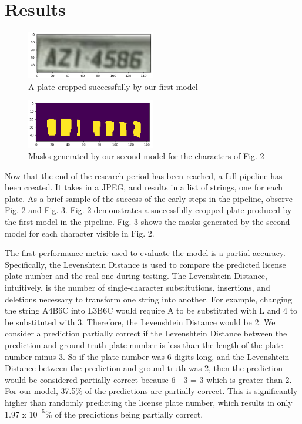 \documentclass[conference]{IEEEtran}
\begin{document}
\section{Results}
\begin{figure}[h]
   \centering
   \includegraphics[width=0.5\textwidth]{plate.png}
   \caption{A plate cropped successfully by our first model}
   \label{fig:image_label}
\end{figure}
\begin{figure}[h]
   \centering
   \includegraphics[width=0.5\textwidth]{charMask.png}
   \caption{Masks generated by our second model for the characters of Fig. 2}
   \label{fig:image_label}
\end{figure}
Now that the end of the research period has been reached, a full pipeline has been created. It takes in a JPEG, and results in a list of strings, one for each plate. As a brief sample of the success of the early steps in the pipeline, observe Fig. 2 and Fig. 3. Fig. 2 demonstrates a successfully cropped plate produced by the first model in the pipeline. Fig. 3 shows the masks generated by the second model for each character visible in Fig. 2. 
\par
The first performance metric used to evaluate the model is a partial accuracy. Specifically, the Levenshtein Distance is used to compare the predicted license plate number and the real one during testing. The Levenshtein Distance, intuitively, is the number of single-character substitutions, insertions, and deletions necessary to transform one string into another. For example, changing the string A4B6C into L3B6C would require A to be substituted with L and 4 to be substituted with 3. Therefore, the Levenshtein Distance would be 2. We consider a prediction partially correct if the Levenshtein Distance between the prediction and ground truth plate number is less than the length of the plate number minus 3. So if the plate number was 6 digits long, and the Levenshtein Distance between the prediction and ground truth was 2, then the prediction would be considered partially correct because 6 - 3 = 3 which is greater than 2. For our model, 37.5\% of the predictions are partially correct. This is significantly higher than randomly predicting the license plate number, which results in only 1.97 x 1$0^{-5}$\% of the predictions being partially correct.
\end{document}
